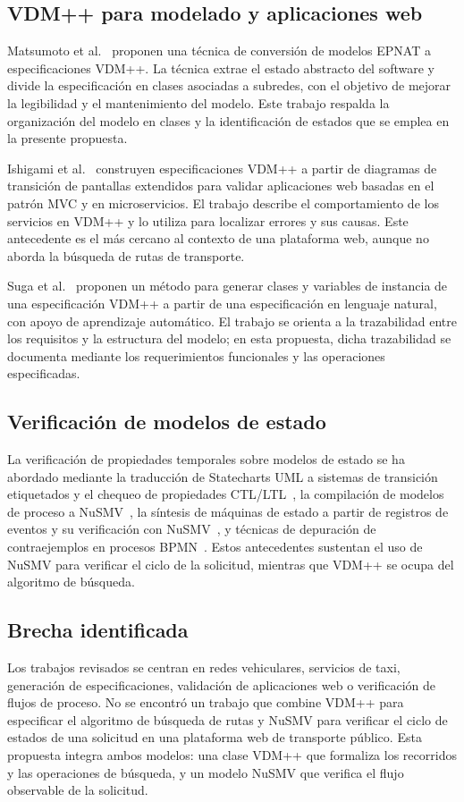 \subsection{VDM++ para modelado y aplicaciones web}
Matsumoto et al.~\cite{matsumoto2024} proponen una técnica de conversión de modelos EPNAT a especificaciones VDM++. La técnica extrae el estado abstracto del software y divide la especificación en clases asociadas a subredes, con el objetivo de mejorar la legibilidad y el mantenimiento del modelo. Este trabajo respalda la organización del modelo en clases y la identificación de estados que se emplea en la presente propuesta.

Ishigami et al.~\cite{ishigami2024} construyen especificaciones VDM++ a partir de diagramas de transición de pantallas extendidos para validar aplicaciones web basadas en el patrón MVC y en microservicios. El trabajo describe el comportamiento de los servicios en VDM++ y lo utiliza para localizar errores y sus causas. Este antecedente es el más cercano al contexto de una plataforma web, aunque no aborda la búsqueda de rutas de transporte.

Suga et al.~\cite{suga2022} proponen un método para generar clases y variables de instancia de una especificación VDM++ a partir de una especificación en lenguaje natural, con apoyo de aprendizaje automático. El trabajo se orienta a la trazabilidad entre los requisitos y la estructura del modelo; en esta propuesta, dicha trazabilidad se documenta mediante los requerimientos funcionales y las operaciones especificadas.

\subsection{Verificación de modelos de estado}
La verificación de propiedades temporales sobre modelos de estado se ha abordado mediante la traducción de Statecharts UML a sistemas de transición etiquetados y el chequeo de propiedades CTL/LTL~\cite{kochaleema2022}, la compilación de modelos de proceso a NuSMV~\cite{hlaoui2025}, la síntesis de máquinas de estado a partir de registros de eventos y su verificación con NuSMV~\cite{xavier2024}, y técnicas de depuración de contraejemplos en procesos BPMN~\cite{nivon2022}. Estos antecedentes sustentan el uso de NuSMV para verificar el ciclo de la solicitud, mientras que VDM++ se ocupa del algoritmo de búsqueda.

\subsection{Brecha identificada}
Los trabajos revisados se centran en redes vehiculares, servicios de taxi, generación de especificaciones, validación de aplicaciones web o verificación de flujos de proceso. No se encontró un trabajo que combine VDM++ para especificar el algoritmo de búsqueda de rutas y NuSMV para verificar el ciclo de estados de una solicitud en una plataforma web de transporte público. Esta propuesta integra ambos modelos: una clase VDM++ que formaliza los recorridos y las operaciones de búsqueda, y un modelo NuSMV que verifica el flujo observable de la solicitud.
